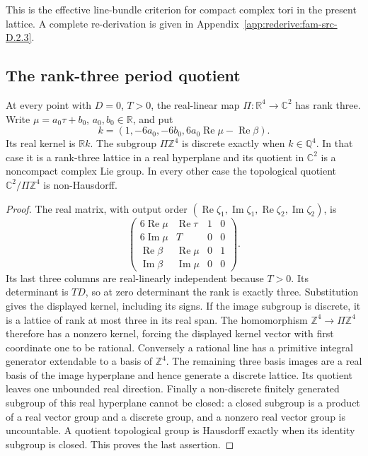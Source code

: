 This is the effective line-bundle criterion for compact complex tori in the present lattice. A complete re-derivation is given in Appendix~\ref{app:rederive:fam-src-D.2.3}.




\subsection{The rank-three period quotient}\label{fam:section:C.3}
\begin{proposition}\label{fam:src:C.3.1}\label{fam:st:C.3.1}
At every point with \(D=0\), \(T>0\), the real-linear map
\(\Pi:\mathbb R^4\to\mathbb C^2\) has rank three. Write
\(\mu=a_0\tau+b_0\), \(a_0,b_0\in\mathbb R\), and put
\[
 k=(1,-6a_0,-6b_0,6a_0\operatorname{Re}\mu-\operatorname{Re}\beta).
\]
Its real kernel is \(\mathbb R k\). The subgroup \(\Pi\mathbb Z^4\) is
discrete exactly when \(k\in\mathbb Q^4\). In that case it is a
rank-three lattice in a real hyperplane and its quotient in \(\mathbb C^2\)
is a noncompact complex Lie group. In every other case the topological
quotient \(\mathbb C^2/\Pi\mathbb Z^4\) is non-Hausdorff.
\end{proposition}

\begin{proof}
The real matrix, with output order
\((\operatorname{Re}\zeta_1,\operatorname{Im}\zeta_1,
\operatorname{Re}\zeta_2,\operatorname{Im}\zeta_2)\), is
\[
 \begin{pmatrix}6\operatorname{Re}\mu&\operatorname{Re}\tau&1&0\\
 6\operatorname{Im}\mu&T&0&0\\
 \operatorname{Re}\beta&\operatorname{Re}\mu&0&1\\
 \operatorname{Im}\beta&\operatorname{Im}\mu&0&0\end{pmatrix}.
\]
Its last three columns are real-linearly independent because \(T>0\).
Its determinant is \(TD\), so at zero determinant the rank is exactly
three. Substitution gives the displayed kernel, including its signs.
If the image subgroup is discrete, it is a lattice of rank at most three
in its real span. The homomorphism \(\mathbb Z^4\to\Pi\mathbb Z^4\)
therefore has a nonzero kernel, forcing the displayed kernel vector with
first coordinate one to be rational. Conversely a rational line has a
primitive integral generator extendable to a basis of \(\mathbb Z^4\).
The remaining three basis images are a real basis of the image hyperplane
and hence generate a discrete lattice. Its quotient leaves one unbounded
real direction. Finally a non-discrete finitely generated subgroup of
this real hyperplane cannot be closed: a closed subgroup is a product of
a real vector group and a discrete group, and a nonzero real vector group
is uncountable. A quotient topological group is Hausdorff exactly when its
identity subgroup is closed. This proves the last assertion.
\end{proof}

